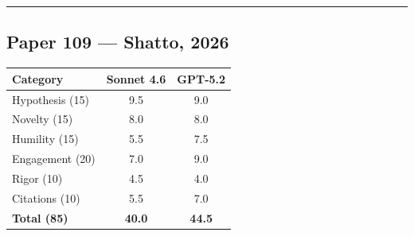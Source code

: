 \documentclass[11pt]{article}
\begin{document}
\bigskip
\hrule
\bigskip

\subsection*{Paper 109 --- Shatto, 2026}

\medskip

\begin{tabular}{lcc}
\toprule
\textbf{Category} & \textbf{Sonnet 4.6} & \textbf{GPT-5.2} \\
\midrule
Hypothesis (15) & 9.5 & 9.0 \\
Novelty (15) & 8.0 & 8.0 \\
Humility (15) & 5.5 & 7.5 \\
Engagement (20) & 7.0 & 9.0 \\
Rigor (10) & 4.5 & 4.0 \\
Citations (10) & 5.5 & 7.0 \\
\midrule
\textbf{Total (85)} & \textbf{40.0} & \textbf{44.5} \\
\bottomrule
\end{tabular}

\bigskip
\end{document}
